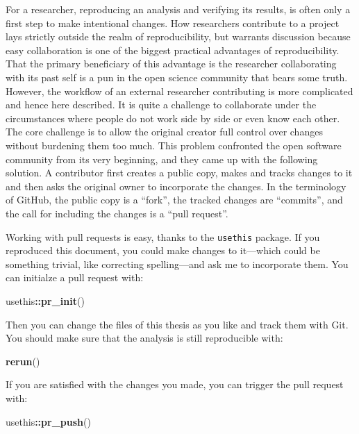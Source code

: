 \documentclass[12pt,a4paper,]{article}
\newenvironment{Shaded}{\begin{snugshade}}{\end{snugshade}}
\newcommand{\KeywordTok}[1]{\textcolor[rgb]{0.13,0.29,0.53}{\textbf{#1}}}
\newcommand{\NormalTok}[1]{#1}
\newcommand{\OperatorTok}[1]{\textcolor[rgb]{0.81,0.36,0.00}{\textbf{#1}}}
\begin{document}
For a researcher, reproducing an analysis and verifying its results, is often only a first step to make intentional changes.
How researchers contribute to a project lays strictly outside the realm of reproducibility, but warrants discussion because easy collaboration is one of the biggest practical advantages of reproducibility.
That the primary beneficiary of this advantage is the researcher collaborating with its past self is a pun in the open science community that bears some truth.
However, the workflow of an external researcher contributing is more complicated and hence here described.
It is quite a challenge to collaborate under the circumstances where people do not work side by side or even know each other.
The core challenge is to allow the original creator full control over changes without burdening them too much.
This problem confronted the open software community from its very beginning, and they came up with the following solution.
A contributor first creates a public copy, makes and tracks changes to it and then asks the original owner to incorporate the changes.
In the terminology of GitHub, the public copy is a ``fork'', the tracked changes are ``commits'', and the call for including the changes is a ``pull request''.

Working with pull requests is easy, thanks to the \texttt{usethis} package.
If you reproduced this document, you could make changes to it---which could be something trivial, like correcting spelling---and ask me to incorporate them.
You can initialze a pull request with:

\begin{Shaded}
\begin{Highlighting}[]
\NormalTok{usethis}\OperatorTok{::}\KeywordTok{pr_init}\NormalTok{()}
\end{Highlighting}
\end{Shaded}

Then you can change the files of this thesis as you like and track them with Git.
You should make sure that the analysis is still reproducible with:

\begin{Shaded}
\begin{Highlighting}[]
\KeywordTok{rerun}\NormalTok{()}
\end{Highlighting}
\end{Shaded}

If you are satisfied with the changes you made, you can trigger the pull request with:

\begin{Shaded}
\begin{Highlighting}[]
\NormalTok{usethis}\OperatorTok{::}\KeywordTok{pr_push}\NormalTok{()}
\end{Highlighting}
\end{Shaded}
\end{document}
